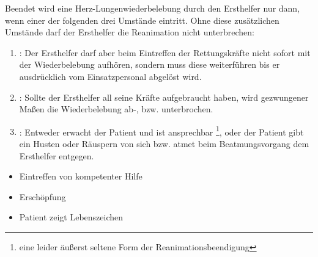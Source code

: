 {
Beendet wird eine Herz-Lungenwiederbelebung durch den Ersthelfer nur
dann, wenn einer der folgenden drei Umstände eintritt. Ohne diese
zusätzlichen Umstände darf der Ersthelfer die Reanimation nicht
unterbrechen: 

\begin{enumerate}
  \item {}: Der
  Ersthelfer darf aber beim Eintreffen der Rettungskräfte
  nicht sofort mit der Wiederbelebung  aufhören, sondern
  muss diese weiterführen bis er ausdrücklich vom
  Einsatzpersonal abgelöst  wird.
  \item {}: Sollte der Ersthelfer all seine
  Kräfte aufgebraucht haben, wird gezwungener Maßen die
  Wiederbelebung ab-, bzw. unterbrochen.
  \item {}: Entweder
  erwacht der Patient und ist ansprechbar \footnote{eine
  leider äußerst seltene Form der Reanimationsbeendigung},
  oder der Patient gibt ein Husten oder Räuspern von sich
  bzw. atmet beim Beatmungsvorgang dem Ersthelfer entgegen.
\end{enumerate}

}{
\begin{itemize}
  \item Eintreffen von kompetenter Hilfe
  \item Erschöpfung
  \item Patient zeigt Lebenszeichen
\end{itemize}
}{}{}{}


